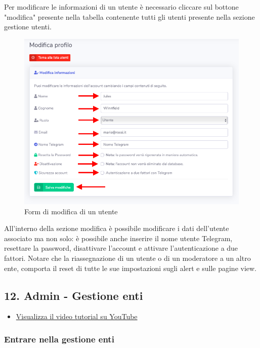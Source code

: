 		Per modificare le informazioni di un utente è necessario cliccare sul bottone "modifica" presente nella tabella contenente tutti gli utenti presente nella sezione gestione utenti.

		\begin{figure}[H]
		\centering
		\includegraphics[scale=0.600]{res/images/admin/modUtente.png}
		\caption{Form di modifica di un utente}
	\end{figure}

		All'interno della sezione modifica è possibile modificare i dati dell'utente associato ma non solo: è possibile anche inserire il nome utente Telegram, resettare la password, disattivare l'account e attivare l'autenticazione a due fattori.
		Notare che la riassegnazione di un utente o di un moderatore a un altro ente, comporta il reset di tutte le sue impostazioni sugli alert e sulle pagine view.

\newpage \subsection{12. Admin - Gestione enti}

	\begin{itemize}
		\item \href{https://www.youtube.com/watch?v=PjySMOLCtMA&list=PLPKYjnuIh1FA3b3jn_bwY_ztYzaFn2mIT&index=15}{Visualizza il video tutorial su YouTube} 
	\end{itemize}
	
	\subsubsection{Entrare nella gestione enti}


